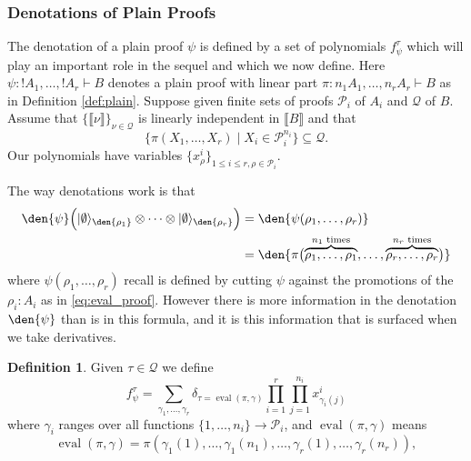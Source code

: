 \documentclass[english,letter paper,12pt,reqno]{article}
\DeclarePairedDelimiter\ket{\lvert}{\rangle}
\theoremstyle{definition}
\newtheorem{definition}[theorem]{Definition}
\def\be{\begin{equation}}
\def\ee{\end{equation}}
\newcommand{\lto}{\longrightarrow}
\begin{document}
\subsubsection{Denotations of Plain Proofs}

The denotation of a plain proof $\psi$ is defined by a set of polynomials $f^\tau_\psi$ which will play an important role in the sequel and which we now define. Here $\psi: !A_1, \ldots, !A_r \vdash B$ denotes a plain proof with linear part $\pi: n_1 A_1, \ldots, n_r A_r \vdash B$ as in Definition \ref{def:plain}. Suppose given finite sets of proofs $\mathcal{P}_i$ of $A_i$ and $\mathcal{Q}$ of $B$. Assume that $\{\llbracket \nu \rrbracket\}_{\nu \in \mathcal{Q}}$ is linearly independent in $\llbracket B \rrbracket$ and that
\begin{equation}
    \{\pi(X_1, \ldots, X_r) \mid X_i \in \mathcal{P}_i^{n_i}\} \subseteq \mathcal{Q}.
\end{equation}
Our polynomials have variables $\{ x^i_\rho \}_{1 \le i \le r, \rho \in \mathcal{P}_i}$.

The way denotations work is that
\begin{align*}
\den{\psi}\Big( \ket{\emptyset}_{\den{\rho_1}} \otimes \cdots \otimes \ket{\emptyset}_{\den{\rho_r}} \Big) &= \den{ \psi( \rho_1, \ldots, \rho_r ) }\\
&= \den{ \pi\big( \overset{n_1 \text{ times}}{\overbrace{\rho_1, \ldots, \rho_1}}, \ldots, \overset{n_r \text{ times}}{\overbrace{\rho_r, \ldots, \rho_r}} \big) }
\end{align*}
where $\psi( \rho_1, \ldots, \rho_r )$ recall is defined by cutting $\psi$ against the promotions of the $\rho_i: A_i$ as in \eqref{eq:eval_proof}. However there is more information in the denotation $\den{\psi}$ than is in this formula, and it is this information that is surfaced when we take derivatives.

\begin{definition}\label{defn:f_tau}
    Given $\tau \in \mathcal{Q}$ we define
    \be
    f_\psi^\tau = \sum_{\gamma_1, \ldots, \gamma_r}\delta_{\tau = \operatorname{eval}(\pi, \gamma)}\prod_{i = 1}^r \prod_{j = 1}^{n_i}x_{\gamma_i(j)}^{i}
    \ee
    where $\gamma_i$ ranges over all functions $\{1, \ldots, n_i\} \lto \mathcal{P}_i$, and $\operatorname{eval}(\pi, \gamma)$ means
\begin{equation}
    \operatorname{eval}(\pi, \gamma) = \pi(\gamma_1(1),\ldots, \gamma_1(n_1), \ldots, \gamma_r(1), \ldots, \gamma_r(n_r)),
\end{equation}
\end{definition}
\end{document}
